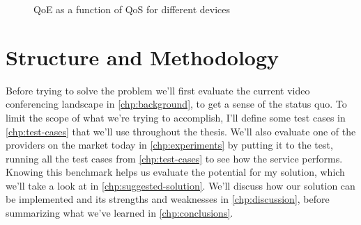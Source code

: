 \begin{figure}
    \centering
    \caption{QoE as a function of QoS for different devices}
    \label{fig:utility}
\end{figure}


\section{Structure and Methodology}

Before trying to solve the problem we'll first evaluate the current video conferencing landscape in \autoref{chp:background}, to get a sense of the status quo. To limit the scope of what we're trying to accomplish, I'll define some test cases in \autoref{chp:test-cases} that we'll use throughout the thesis. We'll also evaluate one of the providers on the market today in \autoref{chp:experiments} by putting it to the test, running all the test cases from \autoref{chp:test-cases} to see how the service performs. Knowing this benchmark helps us evaluate the potential for my solution, which we'll take a look at in \autoref{chp:suggested-solution}. We'll discuss how our solution can be implemented and its strengths and weaknesses in \autoref{chp:discussion}, before summarizing what we've learned in \autoref{chp:conclusions}.


